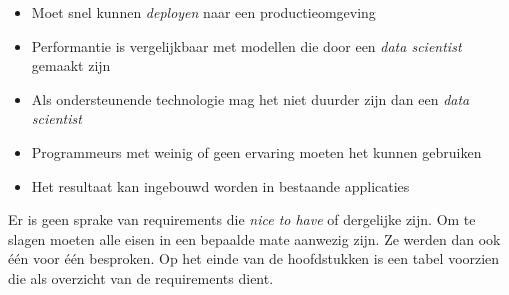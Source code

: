\begin{itemize}
    \item Moet snel kunnen \textit{deployen} naar een productieomgeving
    \item Performantie is vergelijkbaar met modellen die door een \textit{data scientist} gemaakt zijn
    \item Als ondersteunende technologie mag het niet duurder zijn dan een \textit{data scientist}
    \item Programmeurs met weinig of geen ervaring moeten het kunnen gebruiken
    \item Het resultaat kan ingebouwd worden in bestaande applicaties
\end{itemize}

Er is geen sprake van requirements die \textit{nice to have} of dergelijke zijn. Om te slagen moeten alle eisen in een bepaalde mate aanwezig zijn. Ze werden dan ook één voor één besproken. Op het einde van de hoofdstukken is een tabel voorzien die als overzicht van de requirements dient.
